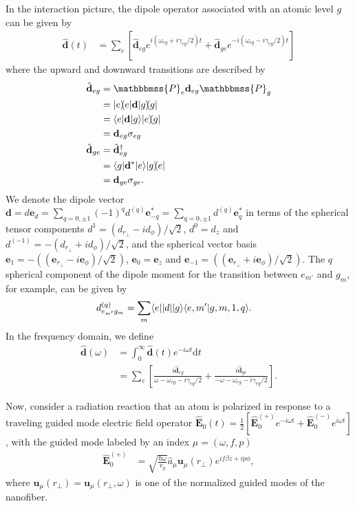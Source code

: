 In the interaction picture, the dipole operator associated with an atomic level $ g $ can be given by
\begin{align}\label{eq:dtop}
\hat{\mathbf{d}}(t) &= \sum_e \left[ \hat{\mathbf{d}}_{eg}e^{i(\omega_{eg}+i\gamma_{eg}/2)t} + \hat{\mathbf{d}}_{ge}e^{-i(\omega_{eg}-i\gamma_{eg}/2)t}\right]
\end{align}
where the upward and downward transitions are described by
\begin{align}
\hat{\mathbf{d}}_{eg} &= \mathbbmss{P}_e\mathbf{d}_{eg}\mathbbmss{P}_g\\
&= \ketbra{e} \mathbf{d}\ketbra{g}\\
&= \bra{e} \mathbf{d}\ket{g} \ket{e}\!\!\bra{g}\\
&= \mathbf{d}_{eg} \sigma_{eg}\\
\hat{\mathbf{d}}_{ge} &=\hat{\mathbf{d}}_{eg}^\dagger \\
&= \bra{g} \mathbf{d}^*\ket{e} \ket{g}\!\!\bra{e}\\
&= \mathbf{d}_{ge}\sigma_{ge}.
\end{align}
We denote the dipole vector $ \mathbf{d}=d\mathbf{e}_d=\sum_{q=0,\pm 1} (-1)^qd^{(q)}\mathbf{e}^*_{-q}=\sum_{q=0,\pm 1} d^{(q)}\mathbf{e}^*_{q} $ in terms of the spherical tensor components $ d^1=(d_{r\!_\perp}-id_{\phi})/\sqrt{2} $, $ d^0=d_z $ and $ d^{(-1)} =-(d_{r\!_\perp}+id_{\phi})/\sqrt{2} $, and the spherical vector basis $ \mathbf{e}_1=-((\mathbf{e}_{r\!_\perp}-i\mathbf{e}_{\phi})/\sqrt{2}) $, $ \mathbf{e}_0=\mathbf{e}_z $ and $ \mathbf{e}_{-1}=((\mathbf{e}_{r\!_\perp}+i\mathbf{e}_{\phi})/\sqrt{2}) $. The $ q $ spherical component of the dipole moment for the transition between $ e_{m'} $ and $ g_m $, for example, can be given by
\begin{align}
d^{(q)}_{e_{m'}g_{m}}&= \sum_m \langle e||d||g\rangle \langle{e,m'}\rvert g,m,1,q\rangle .
\end{align}
In the frequency domain, we define 
\begin{align}
\hat{\mathbf{d}}(\omega) &= \int_0^\infty \hat{\mathbf{d}}(t)e^{-i\omega t}\mathrm{d}t\\
&= \sum_e \left[ \frac{i\hat{\mathbf{d}}_{eg}}{ \omega -\omega_{eg}-i\gamma_{eg}/2 } + \frac{i\hat{\mathbf{d}}_{ge}}{ - \omega-\omega_{eg}-i\gamma_{eg}/2}\right].
\end{align}

Now, consider a radiation reaction that an atom is polarized in response to a traveling guided mode electric field operator $ \hat{\mathbf{E}}_0(t)=\frac{1}{2}\left[\hat{\mathbf{E}}^{(+)}_0e^{-i\omega t} +  \hat{\mathbf{E}}^{(-)}_0e^{i\omega t}\right] $, with the guided mode labeled by an index $ \mu = (\omega,f,p)$
\begin{align}
\hat{\mathbf{E}}^{(+)}_0 &= \sqrt{\frac{\hbar \omega}{v_g}} \hat{a}_\mu \mathbf{u}_{\mu} (r\!_\perp) e^{if\beta z+ip\phi},
\end{align} 
where $ \mathbf{u}_{\mu} (r\!_\perp)=\mathbf{u}_\mu(r\!_\perp,\omega) $  is one of the normalized guided modes of the nanofiber. 

